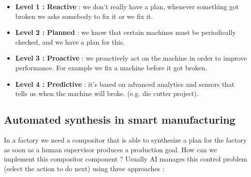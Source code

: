 \documentclass[11pt]{article}
\begin{document}
\begin{itemize}
\item \textbf{Level 1 : Reactive} : we don't really have a plan, whenever something got broken we asks somebody to fix it or we fix it.

\item \textbf{Level 2 : Planned} : we know that certain machines must be periodically checked, and we have a plan for this.

\item \textbf{Level 3 : Proactive} : we proactively act on the machine in order to improve performance. For example we fix a machine before it got broken.

\item \textbf{Level 4 : Predictive} : it's based on advanced analytics and sensors that tells us when the machine will broke. (e.g. die cutter project).
\end{itemize}

\subsection{Automated synthesis in smart manufacturing}
In a factory we need a compositor that is able to synthesize a plan for the factory as soon as a human supervisor produces a production goal. How can we implement this compositor component ? Usually AI manages this control problem (select the action to do next) using three approaches :
\end{document}
